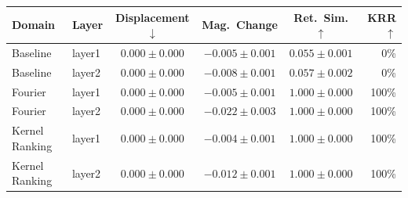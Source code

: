 \begin{tabular}{llcccr}
\hline
Domain & Layer & Displacement $\downarrow$ & Mag.~Change & Ret.~Sim. $\uparrow$ & KRR $\uparrow$ \\
\hline
Baseline & layer1 & $0.000 \pm 0.000$ & $-0.005 \pm 0.001$ & $0.055 \pm 0.001$ & 0\% \\
Baseline & layer2 & $0.000 \pm 0.000$ & $-0.008 \pm 0.001$ & $0.057 \pm 0.002$ & 0\% \\
\hline
Fourier & layer1 & $0.000 \pm 0.000$ & $-0.005 \pm 0.001$ & $1.000 \pm 0.000$ & 100\% \\
Fourier & layer2 & $0.000 \pm 0.000$ & $-0.022 \pm 0.003$ & $1.000 \pm 0.000$ & 100\% \\
\hline
Kernel Ranking & layer1 & $0.000 \pm 0.000$ & $-0.004 \pm 0.001$ & $1.000 \pm 0.000$ & 100\% \\
Kernel Ranking & layer2 & $0.000 \pm 0.000$ & $-0.012 \pm 0.001$ & $1.000 \pm 0.000$ & 100\% \\
\hline
\end{tabular}
